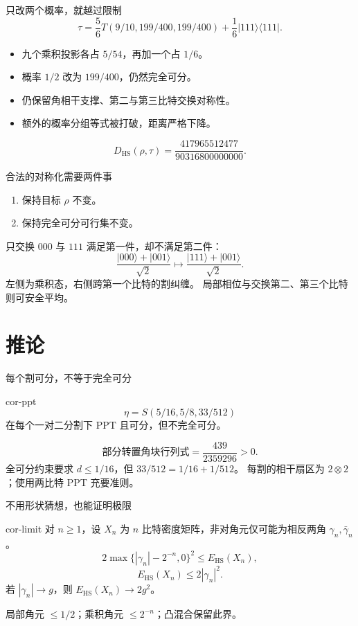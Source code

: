 \documentclass{beamer}
\begin{document}
\begin{frame}{只改两个概率，就越过限制}
\[
\tau=\frac56T(9/10,199/400,199/400)+\frac16|111\rangle\langle111|.
\]
\begin{itemize}
\item 九个乘积投影各占 $5/54$，再加一个占 $1/6$。
\item 概率 $1/2$ 改为 $199/400$，仍然完全可分。
\item 仍保留角相干支撑、第二与第三比特交换对称性。
\item 额外的概率分组等式被打破，距离严格下降。
\end{itemize}
\[
D_{\mathrm{HS}}(\rho,\tau)=\frac{417965512477}{90316800000000}.
\]
\end{frame}
\begin{frame}{合法的对称化需要两件事}
\begin{enumerate}
\item 保持目标 $\rho$ 不变。
\item 保持完全可分可行集不变。
\end{enumerate}
只交换 $000$ 与 $111$ 满足第一件，却不满足第二件：
\[
\frac{|000\rangle+|001\rangle}{\sqrt2}
\longmapsto\frac{|111\rangle+|001\rangle}{\sqrt2}.
\]
左侧为乘积态，右侧跨第一个比特的割纠缠。
\medskip
局部相位与交换第二、第三个比特则可安全平均。
\end{frame}
\section{推论}
\begin{frame}{每个割可分，不等于完全可分}
\begin{bookresult}{cor-ppt}
\[
\eta=S(5/16,5/8,33/512)
\]
在每个一对二分割下 PPT 且可分，但不完全可分。
\end{bookresult}
\[
\text{部分转置角块行列式}=\frac{439}{2359296}>0.
\]
全可分约束要求 $d\le1/16$，但 $33/512=1/16+1/512$。
\medskip
每割的相干扇区为 $2\otimes2$；使用两比特 PPT 充要准则。
\end{frame}
\begin{frame}{不用形状猜想，也能证明极限}
\begin{bookresult}{cor-limit}
对 $n\ge1$，设 $X_n$ 为 $n$ 比特密度矩阵，非对角元仅可能为相反两角 $\gamma_n,\bar\gamma_n$。
\[
2\max\{|\gamma_n|-2^{-n},0\}^2\le E_{\mathrm{HS}}(X_n),
\]
\[
E_{\mathrm{HS}}(X_n)\le2|\gamma_n|^2.
\]
若 $|\gamma_n|\to g$，则 $E_{\mathrm{HS}}(X_n)\to2g^2$。
\end{bookresult}
局部角元 $\le1/2$；乘积角元 $\le2^{-n}$；凸混合保留此界。
\end{frame}
\end{document}
